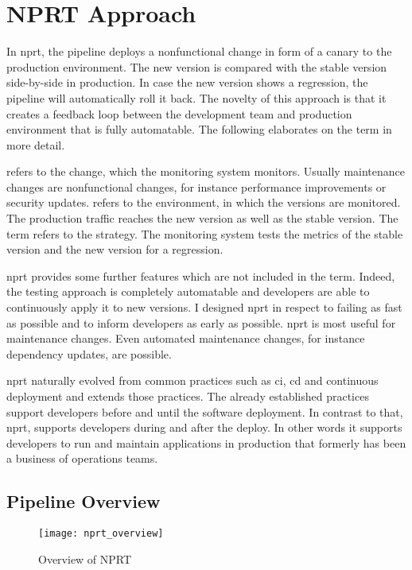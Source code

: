 \chapter{NPRT Approach}
\label{chap:macro}

In \gls{nprt}, the pipeline deploys a nonfunctional change in form of a canary to the
production environment. The new version is compared with the stable version side-by-side
in production. In case the new version shows a regression, the pipeline will automatically
roll it back. The novelty of this approach is that it creates a feedback loop between the
development team and production environment that is fully automatable. The following
elaborates on the term in more detail.

 refers to the change, which the monitoring system
monitors. Usually maintenance changes are nonfunctional changes, for instance performance
improvements or security updates.  refers to the environment, in which
the versions are monitored. The production traffic reaches the new version as well as the
stable version. The term  refers to the  strategy. The
monitoring system tests the metrics of the stable version and the new version for a
regression.

\gls{nprt} provides some further features which are not included in the term. Indeed, the
testing approach is completely automatable and developers are able to continuously apply
it to new versions. I designed \gls{nprt} in respect to failing as fast as possible and to
inform developers as early as possible. \gls{nprt} is most useful for maintenance
changes. Even automated maintenance changes, for instance dependency updates, are
possible.

\gls{nprt} naturally evolved from common practices such as \gls{ci}, \gls{cd} and
continuous deployment and extends those practices. The already established practices
support developers before and until the software deployment. In contrast to that,
\gls{nprt}, supports developers during and after the deploy. In other words it supports
developers to run and maintain applications in production that formerly has been a
business of operations teams.

\section{Pipeline Overview}

\begin{figure}[htbp]
  \texttt{[image: nprt\_overview]}
  \caption{Overview of NPRT}
  \label{fig:nprt_flow}
\end{figure}

